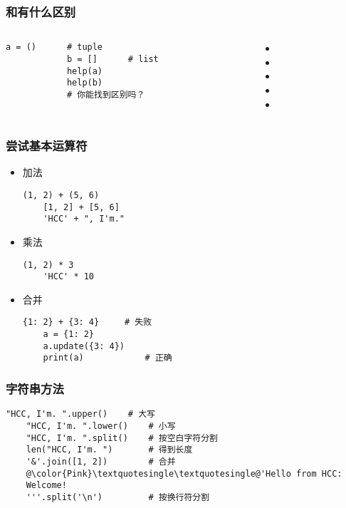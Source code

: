 \begin{CJK}{UTF8}{gbsn}
\begin{frame} [fragile]
	\frametitle{和有什么区别}
	\linespread{1.5}
	\begin{columns}[T]
		\begin{column}[T]{.5\textwidth}
			\begin{lstlisting}[style=pythonstyle, gobble=12, texcl]
			a = ()		# tuple
			b = []		# list
			help(a)
			help(b)
			# 你能找到区别吗？
			\end{lstlisting}
		\end{column}
		\begin{column}[T]{.5\textwidth}
			\begin{itemize}
			\item {}
			\item {}
			\item {}
			\item {}
			\item {}
			\end{itemize}
		\end{column}
	\end{columns}
\end{frame}

\begin{frame} [fragile]
	\frametitle{尝试基本运算符}
	\begin{itemize}
	\item 加法
	\begin{lstlisting}[style=pythonstyle, gobble=4, texcl]
	(1, 2) + (5, 6)
	[1, 2] + [5, 6]
	'HCC' + ", I'm."
	\end{lstlisting}
	\item 乘法
	\begin{lstlisting}[style=pythonstyle, gobble=4, texcl]
	(1, 2) * 3
	'HCC' * 10
	\end{lstlisting}
	\item 合并
	\begin{lstlisting}[style=pythonstyle, gobble=4, texcl]
	{1: 2} + {3: 4}		# 失败
	a = {1: 2}
	a.update({3: 4})
	print(a)			# 正确
	\end{lstlisting}
	\end{itemize}
\end{frame}

\begin{frame} [fragile]
	\frametitle{字符串方法}
	\linespread{1.5}
	\begin{lstlisting}[style=pythonstyle, gobble=4, texcl, escapechar=@]
	"HCC, I'm. ".upper()	# 大写
	"HCC, I'm. ".lower()	# 小写
	"HCC, I'm. ".split()	# 按空白字符分割
	len("HCC, I'm. ")		# 得到长度
	'&'.join([1, 2])		# 合并
	@\color{Pink}\textquotesingle\textquotesingle@'Hello from HCC:
	Welcome!
	'''.split('\n')			# 按换行符分割
	\end{lstlisting}
\end{frame}


\end{CJK}
